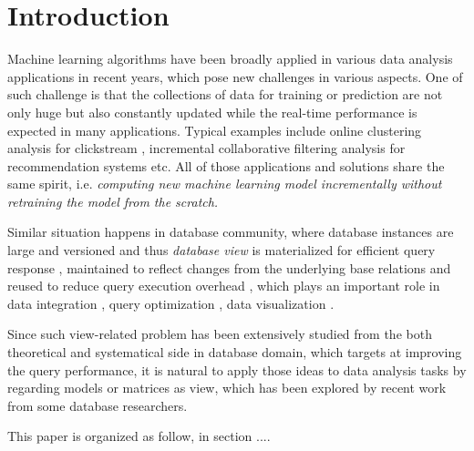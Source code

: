 \section{Introduction}

Machine learning algorithms have been broadly applied in various data analysis applications in recent years, which pose new challenges in various aspects. One of such challenge is that the collections of data for training or prediction are not only huge but also constantly updated while the real-time performance is expected in many applications. Typical examples include online clustering analysis for clickstream \cite{guha2000clustering}, incremental collaborative filtering analysis for recommendation systems \cite{papagelis2005incremental} etc. All of those applications and solutions share the same spirit, i.e. {\em computing new machine learning model incrementally without retraining the model from the scratch.}

Similar situation happens in database community, where database instances are large and versioned and thus {\em database view} is materialized for efficient query response \cite{date2006relational}, maintained to reflect changes from the underlying base relations \cite{gupta1993maintaining, green2007update} and reused to reduce query execution overhead \cite{halevy2001answering}, which plays an important role in data integration \cite{levy1996querying}, query optimization \cite{rajaraman1995answering}, data visualization \cite{brachman1993integrated}. 

Since such view-related problem has been extensively studied from the both theoretical and systematical side in database domain, which targets at improving the query performance, it is natural to apply those ideas to data analysis tasks by regarding models or matrices as view, which has been explored by recent work from some database researchers. 

This paper is organized as follow, in section ....
